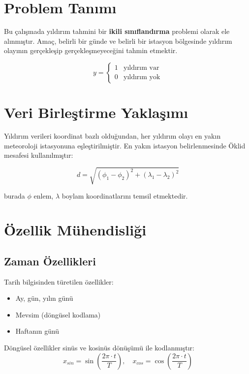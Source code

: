 \section{Problem Tanımı}

Bu çalışmada yıldırım tahmini bir \textbf{ikili sınıflandırma} problemi olarak ele alınmıştır. Amaç, belirli bir günde ve belirli bir istasyon bölgesinde yıldırım olayının gerçekleşip gerçekleşmeyeceğini tahmin etmektir.

\begin{equation}
    y = \begin{cases} 
        1 & \text{yıldırım var} \\
        0 & \text{yıldırım yok}
    \end{cases}
\end{equation}

\section{Veri Birleştirme Yaklaşımı}

Yıldırım verileri koordinat bazlı olduğundan, her yıldırım olayı en yakın meteoroloji istasyonuna eşleştirilmiştir. En yakın istasyon belirlenmesinde Öklid mesafesi kullanılmıştır:

\begin{equation}
    d = \sqrt{(\phi_1 - \phi_2)^2 + (\lambda_1 - \lambda_2)^2}
\end{equation}

burada $\phi$ enlem, $\lambda$ boylam koordinatlarını temsil etmektedir.

\section{Özellik Mühendisliği}

\subsection{Zaman Özellikleri}

Tarih bilgisinden türetilen özellikler:
\begin{itemize}
    \item Ay, gün, yılın günü
    \item Mevsim (döngüsel kodlama)
    \item Haftanın günü
\end{itemize}

Döngüsel özellikler sinüs ve kosinüs dönüşümü ile kodlanmıştır:
\begin{equation}
    x_{sin} = \sin\left(\frac{2\pi \cdot t}{T}\right), \quad
    x_{cos} = \cos\left(\frac{2\pi \cdot t}{T}\right)
\end{equation}

